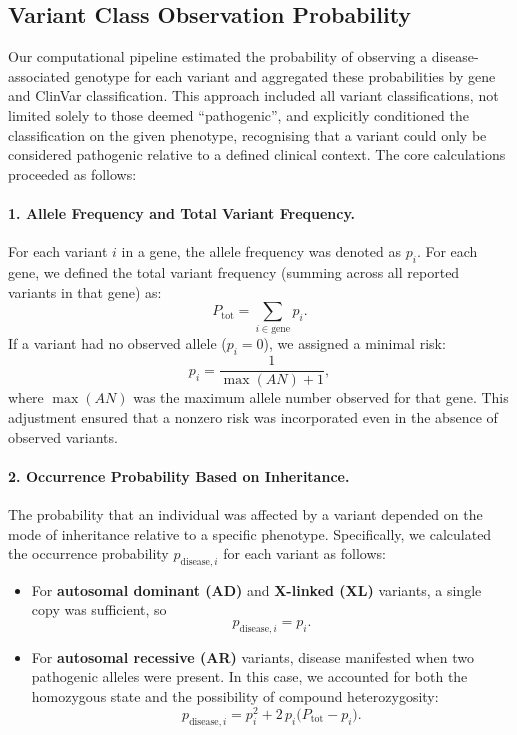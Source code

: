 \subsection{Variant Class Observation Probability}

Our computational pipeline estimated the probability of observing a disease-associated genotype for each variant and aggregated these probabilities by gene and ClinVar classification. This approach included all variant classifications, not limited solely to those deemed ``pathogenic'', and explicitly conditioned the classification on the given phenotype, recognising that a variant could only be considered pathogenic relative to a defined clinical context. The core calculations proceeded as follows:

\paragraph{1. Allele Frequency and Total Variant Frequency.}
For each variant \(i\) in a gene, the allele frequency was denoted as \(p_i\). For each gene, we defined the total variant frequency (summing across all reported variants in that gene) as:
\[
P_{\text{tot}} = \sum_{i \in \text{gene}} p_i.
\]
If a variant had no observed allele (\(p_i = 0\)), we assigned a minimal risk:
\[
p_i = \frac{1}{\max(AN) + 1},
\]
where \(\max(AN)\) was the maximum allele number observed for that gene. This adjustment ensured that a nonzero risk was incorporated even in the absence of observed variants.
\paragraph{2. Occurrence Probability Based on Inheritance.}
The probability that an individual was affected by a variant depended on the mode of inheritance relative to a specific phenotype. Specifically, we calculated the occurrence probability \(p_{\text{disease},i}\) for each variant as follows:
\begin{itemize}
    \item For \textbf{autosomal dominant (AD)} and \textbf{X-linked (XL)} variants, a single copy was sufficient, so
    \[
    p_{\text{disease},i} = p_i.
    \]
    \item For \textbf{autosomal recessive (AR)} variants, disease manifested when two pathogenic alleles were present. In this case, we accounted for both the homozygous state and the possibility of compound heterozygosity:
    \[
    p_{\text{disease},i} = p_i^2 + 2\,p_i\bigl(P_{\text{tot}} - p_i\bigr).
    \]
\end{itemize}

